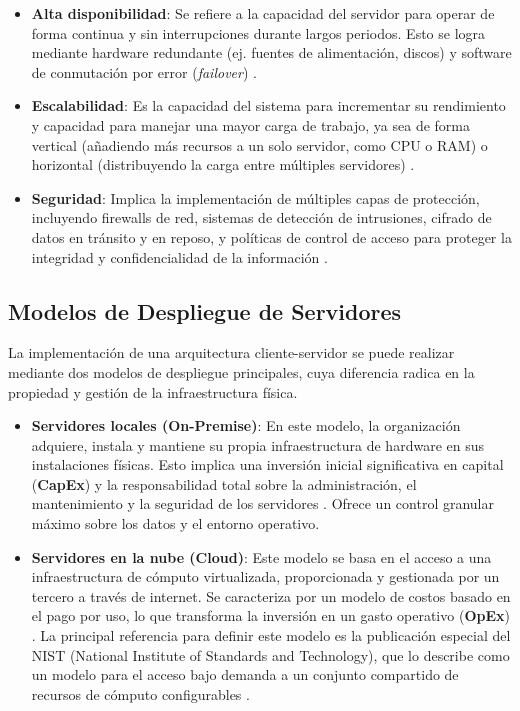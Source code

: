 \begin{itemize}
    \item \textbf{Alta disponibilidad}: Se refiere a la capacidad del servidor para operar de forma continua y sin interrupciones durante largos periodos. Esto se logra mediante hardware redundante (ej. fuentes de alimentación, discos) y software de conmutación por error (\textit{failover}) \cite{Stanek2014}.
    \item \textbf{Escalabilidad}: Es la capacidad del sistema para incrementar su rendimiento y capacidad para manejar una mayor carga de trabajo, ya sea de forma vertical (añadiendo más recursos a un solo servidor, como CPU o RAM) o horizontal (distribuyendo la carga entre múltiples servidores) \cite{Mancera2015}.
    \item \textbf{Seguridad}: Implica la implementación de múltiples capas de protección, incluyendo firewalls de red, sistemas de detección de intrusiones, cifrado de datos en tránsito y en reposo, y políticas de control de acceso para proteger la integridad y confidencialidad de la información \cite{Espana2003}.
\end{itemize}

\subsection{Modelos de Despliegue de Servidores}
\label{subsec:modelos_despliegue}

La implementación de una arquitectura cliente-servidor se puede realizar mediante dos modelos de despliegue principales, cuya diferencia radica en la propiedad y gestión de la infraestructura física.

\begin{itemize}
    \item \textbf{Servidores locales (On-Premise)}: En este modelo, la organización adquiere, instala y mantiene su propia infraestructura de hardware en sus instalaciones físicas. Esto implica una inversión inicial significativa en capital (\textbf{CapEx}) y la responsabilidad total sobre la administración, el mantenimiento y la seguridad de los servidores \cite{Mullins2012}. Ofrece un control granular máximo sobre los datos y el entorno operativo.

    \item \textbf{Servidores en la nube (Cloud)}: Este modelo se basa en el acceso a una infraestructura de cómputo virtualizada, proporcionada y gestionada por un tercero a través de internet. Se caracteriza por un modelo de costos basado en el pago por uso, lo que transforma la inversión en un gasto operativo (\textbf{OpEx}) \cite{softteco2024}. La principal referencia para definir este modelo es la publicación especial del NIST (National Institute of Standards and Technology), que lo describe como un modelo para el acceso bajo demanda a un conjunto compartido de recursos de cómputo configurables \cite{mell2011nist}.
\end{itemize}

